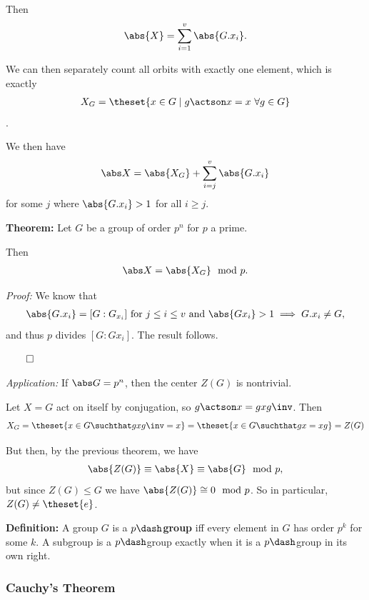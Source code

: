 Then
\begin{align*}
\abs{X} = \sum_{i=1}^v \abs{G .x_i}.
\end{align*}

We can then separately count all orbits with exactly one element, which
is exactly
\begin{align*}
X_G = \theset{x\in G \mid g\actson x = x ~ \forall g\in G}
\end{align*}.

We then have
\begin{align*}
\abs X = \abs{X_G} + \sum_{i=j}^v \abs{G. x_i}
\end{align*} for some \(j\) where \(\abs{G.x_i} > 1\) for all
\(i \geq j\).

\textbf{Theorem:} Let \(G\) be a group of order \(p^n\) for \(p\) a
prime.

Then
\begin{align*}
\abs X = \abs{X_G} \mod p
.\end{align*}

\emph{Proof:} We know that
\begin{align*}
\abs{G.x_i} = [G : G_{x_i}] \text{ for } j \leq i \leq v \text{ and } \abs{Gx_i} > 1 \implies G.x_i \neq G
,\end{align*} and thus \(p\) divides \([G: G x_i]\). The result follows.

\(\qed\)

\emph{Application:} If \(\abs G = p^n\), then the center \(Z(G)\) is
nontrivial.

Let \(X=G\) act on itself by conjugation, so \(g\actson x = gxg\inv\).
Then
\begin{align*}
X_G = \theset{x\in G \suchthat gxg\inv = x} = \theset{x\in G \suchthat gx = xg} = Z(G)
\end{align*}

But then, by the previous theorem, we have
\begin{align*}
\abs{Z(G)} \equiv \abs{X}\equiv \abs{G} \mod p
,\end{align*} but since \(Z(G) \leq G\) we have
\(\abs{Z(G)} \cong 0 \mod p\). So in particular,
\(Z(G) \neq \theset{e}\).

\textbf{Definition:} A group \(G\) is a \textbf{\(p\dash\)group} iff
every element in \(G\) has order \(p^k\) for some \(k\). A subgroup is a
\(p\dash\)group exactly when it is a \(p\dash\)group in its own right.

\hypertarget{cauchys-theorem}{%
\subsubsection{Cauchy's Theorem}\label{cauchys-theorem}}

